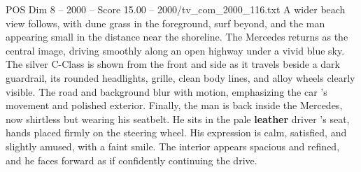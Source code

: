 \begin{textsample}{POS Dim 8 – 2000 – Score 15.00 – 2000/tv\_com\_2000\_116.txt}
A wider beach view follows, with dune grass in the foreground, surf beyond, and the man appearing small in the distance near the shoreline.
The Mercedes returns as the central image, driving smoothly along an open highway under a vivid blue sky.
The silver C-Class is shown from the front and side as it travels beside a dark guardrail, its rounded headlights, grille, clean body lines, and alloy wheels clearly visible.
The road and background blur with motion, emphasizing the car ’s movement and polished exterior.
Finally, the man is back inside the Mercedes, now shirtless but wearing his seatbelt.
He sits in the pale \textbf{leather} driver ’s seat, hands placed firmly on the steering wheel.
His expression is calm, satisfied, and slightly amused, with a faint smile.
The interior appears spacious and refined, and he faces forward as if confidently continuing the drive.

\end{textsample}
